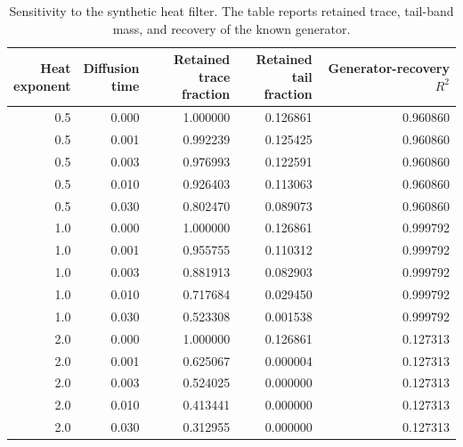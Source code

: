 \documentclass{article}
\begin{document}
\begin{table}[H]
\centering
\setlength{\tabcolsep}{3pt}
\caption{Sensitivity to the synthetic heat filter. The table reports retained trace, tail-band mass, and recovery of the known generator.}
\label{tab:supp-heat}
\begin{tabular*}{\linewidth}{@{\extracolsep{\fill}}rrrrr@{}}
\toprule
\shortstack{Heat\\exponent} & \shortstack{Diffusion\\time} & \shortstack{Retained\\trace fraction} & \shortstack{Retained\\tail fraction} & \shortstack{Generator-recovery\\$R^2$} \\
\midrule
0.5 & 0.000 & 1.000000 & 0.126861 & 0.960860 \\
0.5 & 0.001 & 0.992239 & 0.125425 & 0.960860 \\
0.5 & 0.003 & 0.976993 & 0.122591 & 0.960860 \\
0.5 & 0.010 & 0.926403 & 0.113063 & 0.960860 \\
0.5 & 0.030 & 0.802470 & 0.089073 & 0.960860 \\
1.0 & 0.000 & 1.000000 & 0.126861 & 0.999792 \\
1.0 & 0.001 & 0.955755 & 0.110312 & 0.999792 \\
1.0 & 0.003 & 0.881913 & 0.082903 & 0.999792 \\
1.0 & 0.010 & 0.717684 & 0.029450 & 0.999792 \\
1.0 & 0.030 & 0.523308 & 0.001538 & 0.999792 \\
2.0 & 0.000 & 1.000000 & 0.126861 & 0.127313 \\
2.0 & 0.001 & 0.625067 & 0.000004 & 0.127313 \\
2.0 & 0.003 & 0.524025 & 0.000000 & 0.127313 \\
2.0 & 0.010 & 0.413441 & 0.000000 & 0.127313 \\
2.0 & 0.030 & 0.312955 & 0.000000 & 0.127313 \\
\bottomrule
\end{tabular*}
\end{table}
\end{document}
